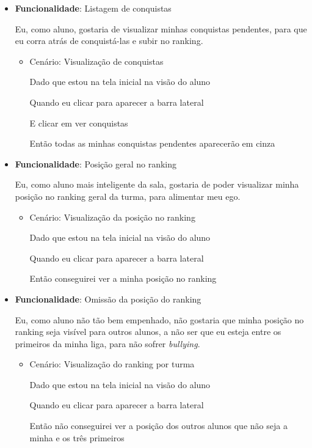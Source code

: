 \documentclass[
    12pt,               %
    openright,          %
    oneside,
    a4paper,            %
    english,            %
    brazil              %
    ]{ifsp-spo-inf-ctds} %
\begin{document}
\begin{itemize}
\item\textbf{Funcionalidade}: Listagem de conquistas
    
    Eu, como aluno, gostaria de visualizar minhas conquistas pendentes, para que eu corra atrás de conquistá-las e subir no ranking.
    \begin{itemize}
        \item Cenário: Visualização de conquistas 
        \par Dado que estou na tela inicial na visão do aluno
        \par Quando eu clicar para aparecer a barra lateral
        \par E clicar em ver conquistas
        \par Então todas as minhas conquistas pendentes aparecerão em cinza
    \end{itemize}  

\item\textbf{Funcionalidade}: Posição geral no ranking
    
    Eu, como aluno mais inteligente da sala, gostaria de poder visualizar minha posição no ranking geral da turma, para alimentar meu ego.
    \begin{itemize}
        \item Cenário: Visualização da posição no ranking
        \par Dado que estou na tela inicial na visão do aluno
        \par Quando eu clicar para aparecer a barra lateral
        \par Então conseguirei ver a minha posição no ranking
    \end{itemize}  

\item\textbf{Funcionalidade}: Omissão da posição do ranking
    
    Eu, como aluno não tão bem empenhado, não gostaria que minha posição no ranking seja visível para outros alunos, a não ser que eu esteja entre os primeiros da minha liga, para não sofrer \textit{bullying}.
    \begin{itemize}
        \item Cenário: Visualização do ranking por turma
        \par Dado que estou na tela inicial na visão do aluno
        \par Quando eu clicar para aparecer a barra lateral
        \par Então não conseguirei ver a posição dos outros alunos que não seja a minha e os três primeiros
    \end{itemize}  


\end{itemize}
\end{document}
